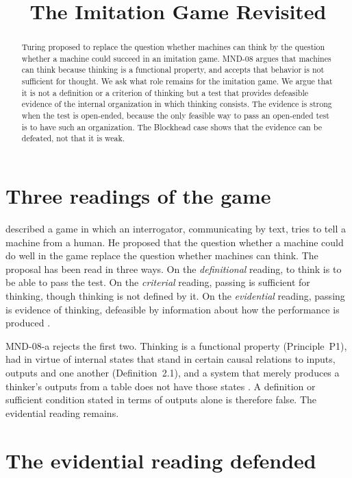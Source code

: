 \documentclass{situationist-preprint}
\title{The Imitation Game Revisited}
\begin{document}
\maketitle

\begin{abstract}
Turing proposed to replace the question whether machines can think by the question whether a machine could succeed in an imitation game. MND-08 argues that machines can think because thinking is a functional property, and accepts that behavior is not sufficient for thought. We ask what role remains for the imitation game. We argue that it is not a definition or a criterion of thinking but a test that provides defeasible evidence of the internal organization in which thinking consists. The evidence is strong when the test is open-ended, because the only feasible way to pass an open-ended test is to have such an organization. The Blockhead case shows that the evidence can be defeated, not that it is weak.
\end{abstract}

\section{Three readings of the game}

\citet{Turing1950} described a game in which an interrogator, communicating by text, tries to tell a machine from a human. He proposed that the question whether a machine could do well in the game replace the question whether machines can think. The proposal has been read in three ways. On the \emph{definitional} reading, to think is to be able to pass the test. On the \emph{criterial} reading, passing is sufficient for thinking, though thinking is not defined by it. On the \emph{evidential} reading, passing is evidence of thinking, defeasible by information about how the performance is produced \citep{Moor1976}.

MND-08-a rejects the first two. Thinking is a functional property (Principle~P1), had in virtue of internal states that stand in certain causal relations to inputs, outputs and one another (Definition~2.1), and a system that merely produces a thinker's outputs from a table does not have those states \citep{Block1981}. A definition or sufficient condition stated in terms of outputs alone is therefore false. The evidential reading remains.

\section{The evidential reading defended}
\end{document}

